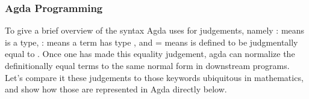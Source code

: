 \begin{code}[hide]
%
\\[\AgdaEmptyExtraSkip]%
\>[0]\AgdaSpace{}%
\AgdaSymbol{=}\AgdaSpace{}%
\<%
\\
%
\\[\AgdaEmptyExtraSkip]%
\>[0]\AgdaSpace{}%
\AgdaSymbol{:}\AgdaSpace{}%
\AgdaSpace{}%
\AgdaSpace{}%
\AgdaSpace{}%
\AgdaSpace{}%
\<%
\\
\>[0]\AgdaSpace{}%
\AgdaSpace{}%
\AgdaSymbol{=}\AgdaSpace{}%
\AgdaSpace{}%
\AgdaSpace{}%
\AgdaSpace{}%
\<%
\\
\>[0]\<%
\end{code}

\subsubsection{Agda Programming}

To give a brief overview of the syntax Agda uses for judgements, namely 
:  means  is a type,  :  means a term 
has type , and  =  means  is defined to be
judgmentally equal to . Once one has made this equality judgement, agda
can normalize the definitionally equal terms to the same normal form in
downstream programs. Let's compare it these judgements to those keywords ubiquitous in
mathematics, and show how those are represented in Agda directly below.

